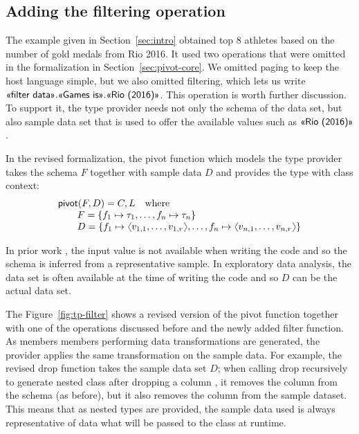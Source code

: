 \documentclass[a4paper,UKenglish]{lipics-v2016}
\theoremstyle{plain}
\theoremstyle{definition}
\newcommand{\vect}[1]{\langl #1 \rangl}
\newcommand{\langl}{\begin{picture}(4.5,7)
\put(1.1,2.5){\rotatebox{60}{\line(1,0){5.5}}}
\put(1.1,2.5){\rotatebox{300}{\line(1,0){5.5}}}
\end{picture}}
\newcommand{\rangl}{\begin{picture}(4.5,7)
\put(.9,2.5){\rotatebox{120}{\line(1,0){5.5}}}
\put(.9,2.5){\rotatebox{240}{\line(1,0){5.5}}}
\end{picture}}
\newcommand{\ball}[1]{\FPeval{\result}{clip(201+#1)}\textnormal{\ding{\result}}}
\newcommand{\ident}[1]{\textnormal{\sffamily #1}}
\newcommand{\qident}[1]{\textnormal{\sffamily \guillemotleft #1\guillemotright}}
\begin{document}

\subsection{Adding the filtering operation}
\label{sec:pivot-filter}

The example given in Section~\ref{sec:intro} obtained top 8 athletes based on the number
of gold medals from Rio 2016. It used two operations that were omitted in the formalization in
Section~\ref{sec:pivot-core}. We omitted paging to keep the host language simple, but we also
omitted filtering, which lets us write $\qident{filter data}.\qident{Games is}.\qident{Rio (2016)}$.
This operation is worth further discussion. To support it, the type provider needs not only the
schema of the data set, but also sample data set that is used to offer the available values such 
as $\qident{Rio (2016)}$.

In the revised formalization, the \ident{pivot} function which models the type provider takes the schema
$F$ together with sample data $D$ and provides the type with class context:
%
\begin{equation*}
\begin{array}{l}
\ident{pivot}(F, D) = C, L \quad \textnormal{where}\\
\qquad F=\{ f_1 \mapsto \tau_1, \ldots, f_n \mapsto \tau_n \}\\
\qquad D=\{ f_1\mapsto \vect{v_{1,1},\ldots,v_{1,r}}, \ldots, f_n\mapsto \vect{v_{n,1},\ldots,v_{n,r}}\} 
\end{array}
\end{equation*}

\noindent
In prior work \cite{fsdata}, the input value is not available when writing 
the code and so the schema is inferred from a representative sample. In exploratory data analysis, the 
data set is often available at the time of writing the code and so $D$ can be the actual data set.

The Figure~\ref{fig:tp-filter} shows a revised version of the \ident{pivot} function \ball{1} 
together with one of the operations discussed before and the newly added \ident{filter} function. 
As members members performing data transformations are generated, the provider applies the same
transformation on the sample data. For example, the revised \ident{drop} function \ball{2} takes
the sample data set $D$; when calling \ident{drop} recursively to generate nested class after
dropping a column \ball{3}, it removes the column from the schema (as before), but it also removes
the column from the sample dataset. This means that as nested types are provided, the sample data
used is always representative of data what will be passed to the class at runtime. 
\end{document}
